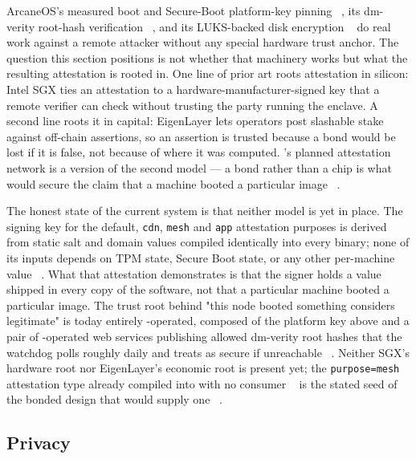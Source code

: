 ArcaneOS's measured boot and Secure-Boot platform-key pinning \shipped\ ,
its dm-verity root-hash verification \shipped\ , and its
LUKS-backed disk encryption \shipped\  do real work
against a remote attacker without any special hardware trust anchor. The question this section
positions is not whether that machinery works but what the resulting attestation is rooted in. One line
of prior art roots attestation in silicon: Intel SGX \citep{costan2016sgx} ties an attestation to a
hardware-manufacturer-signed key that a remote verifier can check without trusting the party running
the enclave. A second line roots it in capital: EigenLayer \citep{eigenlayer} lets operators post
slashable stake against off-chain assertions, so an assertion is trusted because a bond would be lost
if it is false, not because of where it was computed. \Flux's planned attestation network is a version
of the second model — a bond rather than a chip is what would secure the claim that a machine booted a
particular image \planned\ .

The honest state of the current system is that neither model is yet in place. The \fluxsas signing key
for the default, \texttt{cdn}, \texttt{mesh} and \texttt{app} attestation purposes is derived from
static salt and domain values compiled identically into every binary; none of its inputs depends on TPM
state, Secure Boot state, or any other per-machine value \shipped\
. What that attestation demonstrates is that the signer
holds a value shipped in every copy of the software, not that a particular machine booted a particular
image. The trust root behind "this node booted something \Flux considers legitimate" is today entirely
\Flux-operated, composed of the platform key above and a pair of \Flux-operated web services publishing
allowed dm-verity root hashes that the watchdog polls roughly daily and treats as secure if unreachable
\shipped\ \srcprivate{\SAS{} watchdog}. Neither SGX's hardware root nor EigenLayer's
economic root is present yet; the \texttt{purpose=\allowbreak{}mesh} attestation type already compiled into
\fluxsas with no consumer \shipped\ \srcprivate{\SAS{} API server} is the stated seed of
the bonded design that would supply one \planned\ \srcintent{§14}.

\subsection{Privacy}

